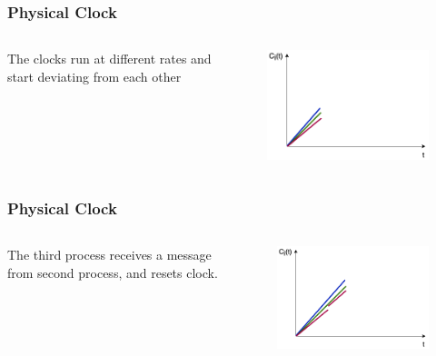 \documentclass{beamer}
\begin{document}
\frame
{
  \frametitle{Physical Clock}
	\begin{columns}
	\begin{column}{0.6\textwidth}
		The clocks run at different rates and start deviating from each other
	\end{column}
	\begin{column}{0.4\textwidth}

		\begin{figure}[ht!]
		\includegraphics[width=\textwidth]{files/ClockDist-Physical-Clock-1.png}
		\end{figure}

	\end{column}
	\end{columns}
}

\frame
{
  \frametitle{Physical Clock}
	\begin{columns}
	\begin{column}{0.6\textwidth}
		The third process receives a message from second process, and resets clock.
	\end{column}
	\begin{column}{0.4\textwidth}

		\begin{figure}[ht!]
		\includegraphics[width=\textwidth]{files/ClockDist-Physical-Clock-2.png}
		\end{figure}

	\end{column}
	\end{columns}
}
\end{document}
